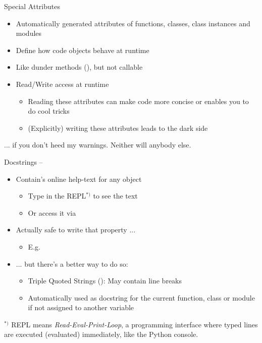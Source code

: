 
\begin{frame}[fragile]{Special Attributes}
%
\begin{itemize}
\item Automatically generated attributes of functions, classes, class instances and modules
\item Define how code objects behave at runtime
\item Like dunder methods (\zB {}), but not callable
\item Read/Write access at runtime
	\begin{itemize}
	\item Reading these attributes can make code more concise or enables you to do cool tricks
	\item (Explicitly) writing these attributes leads to the dark side
	\end{itemize}
\end{itemize}
%
\vspace{6pt}
\begin{warnbox}
... if you don't heed my warnings. Neither will anybody else.
\end{warnbox}
%
\end{frame}


\begin{frame}[fragile]{Docstrings -- }
%
\begin{itemize}
\item Contain's online help-text for any object
	\begin{itemize}
	\item Type  in the REPL$^{*)}$ to see the text
	\item Or access it via  
	\end{itemize}
\item Actually safe to write that property ...
	\begin{itemize}
	\item E.\;g. 
	\end{itemize}
\item ... but there's a better way to do so:
	\begin{itemize}
	\item Triple Quoted Strings (): May contain line breaks
	\item Automatically used as docstring for the current function, class or module if not assigned to another variable
	\end{itemize}
\end{itemize}
%
\begin{hintbox}[REPL]
$^{*)}$ REPL means \emph{Read-Eval-Print-Loop}, \ie a programming interface where typed lines are executed (evaluated) immediately, like the Python console.
\end{hintbox}
%
\end{frame}

